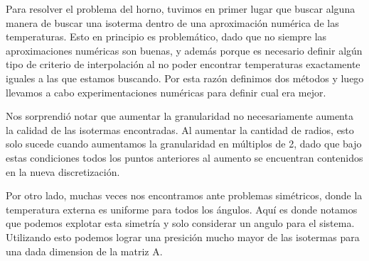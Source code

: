 Para resolver el problema del horno, tuvimos en primer lugar que buscar alguna manera de buscar una isoterma dentro de una aproximación numérica de las temperaturas. Esto en principio es problemático, dado que no siempre las aproximaciones numéricas son buenas, y además porque es necesario definir algún tipo de criterio de interpolación al no poder encontrar temperaturas exactamente iguales a las que estamos buscando. Por esta razón definimos dos métodos y luego llevamos a cabo experimentaciones numéricas para definir cual era mejor. 

Nos sorprendió notar que aumentar la granularidad no necesariamente aumenta la calidad de las isotermas encontradas. Al aumentar la cantidad de radios, esto solo sucede cuando aumentamos la granularidad en múltiplos de 2, dado que bajo estas condiciones todos los puntos anteriores al aumento se encuentran contenidos en la nueva discretización.

Por otro lado, muchas veces nos encontramos ante problemas simétricos, donde la temperatura externa es uniforme para todos los ángulos. Aquí es donde notamos que podemos explotar esta simetría y solo considerar un angulo para el sistema. Utilizando esto podemos lograr una presición mucho mayor de las isotermas para una dada dimension de la matriz A.